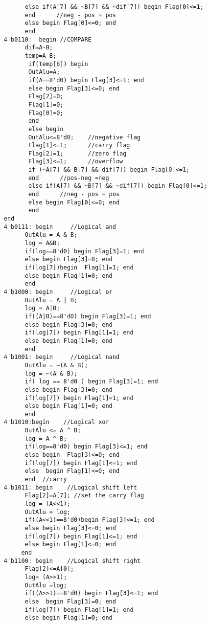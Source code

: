 \documentclass[12pt]{article}
\begin{document}
\begin{lstlisting}
           else if(A[7] && ~B[7] && ~dif[7]) begin Flag[0]<=1;
           end      //neg - pos = pos
           else begin Flag[0]<=0; end
           end
     4'b0110:  begin //COMPARE
           dif=A-B;
           temp=A-B;            
            if(temp[8]) begin
            OutAlu=A; 
            if(A==8'd0) begin Flag[3]<=1; end
            else begin Flag[3]<=0; end
            Flag[2]=0;
            Flag[1]=0;
            Flag[0]=0;
            end
            else begin
            OutAlu<=8'd0;    //negative flag
            Flag[1]<=1;      //carry flag
            Flag[2]=1;       //zero flag
            Flag[3]<=1;      //overflow
            if (~A[7] && B[7] && dif[7]) begin Flag[0]<=1; 
            end      //pos-neg =neg
            else if(A[7] && ~B[7] && ~dif[7]) begin Flag[0]<=1;
            end      //neg - pos = pos
            else begin Flag[0]<=0; end
            end
     end      
     4'b0111: begin     //Logical and
           OutAlu = A & B;
           log = A&B;
           if(log==8'd0) begin Flag[3]=1; end
           else begin Flag[3]=0; end
           if(log[7])begin  Flag[1]=1; end
           else begin Flag[1]=0; end
           end
     4'b1000: begin     //Logical or
           OutAlu = A | B;
           log = A|B;
           if((A|B)==8'd0) begin Flag[3]=1; end
           else begin Flag[3]=0; end
           if(log[7]) begin Flag[1]=1; end
           else begin Flag[1]=0; end
           end
     4'b1001: begin     //Logical nand
           OutAlu = ~(A & B);
           log = ~(A & B);
           if( log == 8'd0 ) begin Flag[3]=1; end
           else begin Flag[3]=0; end
           if(log[7]) begin Flag[1]=1; end
           else begin Flag[1]=0; end
           end
     4'b1010:begin    //Logical xor
           OutAlu <= A ^ B;
           log = A ^ B;
           if(log==8'd0) begin Flag[3]<=1; end
           else begin  Flag[3]<=0; end
           if(log[7]) begin Flag[1]<=1; end
           else  begin Flag[1]<=0; end
           end  //carry
     4'b1011: begin    //Logical shift left
           Flag[2]=A[7]; //set the carry flag
           log = (A<<1);
           OutAlu = log;
           if((A<<1)==8'd0)begin Flag[3]<=1; end
           else begin Flag[3]<=0; end
           if(log[7]) begin Flag[1]<=1; end
           else begin Flag[1]<=0; end
          end
     4'b1100: begin    //Logical shift right 
           Flag[2]<=A[0];
           log= (A>>1);
           OutAlu =log;
           if((A>>1)==8'd0) begin Flag[3]<=1; end
           else  begin Flag[3]=0; end
           if(log[7]) begin Flag[1]=1; end
           else begin Flag[1]=0; end

\end{lstlisting}
\end{document}
